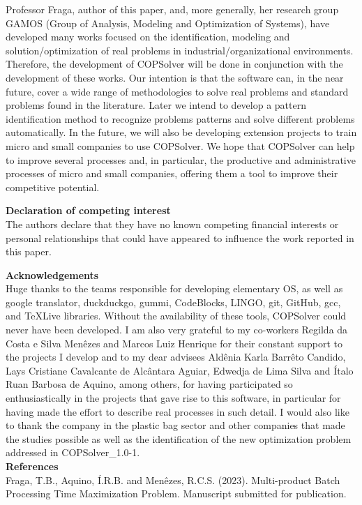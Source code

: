 \documentclass[11pt, letterpaper]{article}
\begin{document}
Professor Fraga, author of this paper, and, more generally, her research group GAMOS (Group of Analysis, Modeling and Optimization of Systems), have developed many works focused on the identification, modeling and solution/optimization of real problems in industrial/organizational environments. Therefore, the development of COPSolver will be done in conjunction with the development of these works. Our intention is that the software can, in the near future, cover a wide range of methodologies to solve real problems and standard problems found in the literature. Later we intend to develop a pattern identification method to recognize problems patterns and solve different problems automatically. In the future, we will also be developing extension projects to train micro and small companies to use COPSolver. We hope that COPSolver can help to improve several processes and, in particular, the productive and administrative processes of micro and small companies, offering them a tool to improve their competitive potential.

\vskip0.3cm
\noindent
\textbf{Declaration of competing interest}\\
The authors declare that they have no known competing financial interests or personal relationships that could have appeared to influence the work reported in this paper.

\vskip0.3cm
\noindent
\textbf{Acknowledgements}\\
Huge thanks to the teams responsible for developing elementary OS, as well as google translator, duckduckgo, gummi, CodeBlocks, LINGO, git, GitHub, gcc, and TeXLive libraries. Without the availability of these tools, COPSolver could never have been developed. I am also very grateful to my co-workers Regilda da Costa e Silva Menêzes and Marcos Luiz Henrique for their constant support to the projects I develop and to my dear advisees Aldênia Karla Barrêto Candido, Lays Cristiane Cavalcante de Alcântara Aguiar, Edwedja de Lima Silva and Ítalo Ruan Barbosa de Aquino, among others, for having participated so enthusiastically in the projects that gave rise to this software, in particular for having made the effort to describe real processes in such detail. I would also like to thank the company in the plastic bag sector and other companies that made the studies possible as well as the identification of the new optimization problem addressed in COPSolver\_1.0-1. \\

\noindent
\textbf{References}\\
Fraga, T.B., Aquino, Í.R.B. and Menêzes, R.C.S. (2023). Multi-product Batch Processing Time Maximization
Problem. Manuscript submitted for publication.  \\

\vskip 1.5cm
\end{document}
